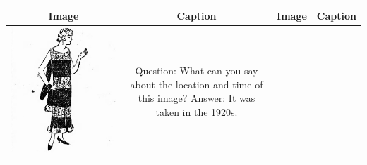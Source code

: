 \begin{table}[ht]
    \centering
    \setlength{\tabcolsep}{5pt}  %
    \begin{tabular}{c|c|c|c}
        \textbf{Image} & \textbf{Caption} & \textbf{Image} & \textbf{Caption} \\
        \hline
        \begin{minipage}[c]{0.2\linewidth}
            \includegraphics[width=\linewidth]{Images/dress.png}
        \end{minipage} &
        \begin{minipage}[c]{0.2\linewidth}
            Question: What can you say about the location and time of this image? Answer: It was taken in the 1920s.
        \end{minipage} &
        \begin{minipage}[c]{0.2\linewidth}

\end{minipage}
\end{tabular}
\end{table}

